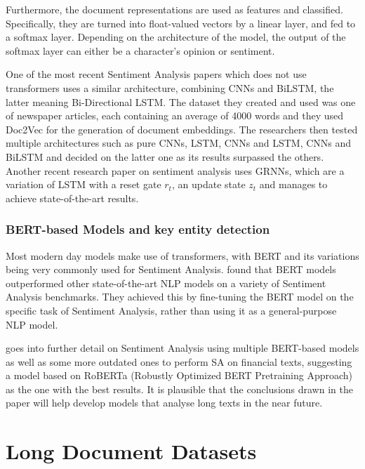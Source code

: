 \documentclass[preprint,review,12pt]{elsarticle}
\begin{document}
Furthermore, the document representations are used as features and classified. Specifically, they are turned into float-valued vectors by a linear layer, and fed to a softmax layer. Depending on the architecture of the model, the output of the softmax layer can either be a character's opinion or sentiment.

One of the most recent Sentiment Analysis papers which does not use transformers\cite{morocco} uses a similar architecture, combining CNNs and BiLSTM, the latter meaning Bi-Directional LSTM. The dataset they created and used was one of newspaper articles, each containing an average of 4000 words and they used Doc2Vec\cite{doc2vec} for the generation of document embeddings. The researchers then tested multiple architectures such as pure CNNs, LSTM, CNNs and LSTM, CNNs and BiLSTM and decided on the latter one as its results surpassed the others. Another recent research paper on sentiment analysis\cite{1453} uses GRNNs\cite{GRNN}, which are a variation of LSTM with a reset gate $r_t$, an update state $z_t$ and manages to achieve state-of-the-art results.

\subsubsection{BERT-based Models and key entity detection} 

Most modern day models make use of transformers, with BERT and its variations being very commonly used for Sentiment Analysis. \citet{toutanova} found that BERT models outperformed other state-of-the-art NLP models on a variety of Sentiment Analysis benchmarks. They achieved this by fine-tuning the BERT model on the specific task of Sentiment Analysis, rather than using it as a general-purpose NLP model.

\citet{xinzhao} goes into further detail on Sentiment Analysis using multiple BERT-based models as well as some more outdated ones to perform SA on financial texts, suggesting a model based on RoBERTa (Robustly Optimized BERT Pretraining Approach) as the one with the best results. It is plausible that the conclusions drawn in the paper will help develop models that analyse long texts in the near future.



\section{Long Document Datasets}
\label{sec::Datasets}
\end{document}
